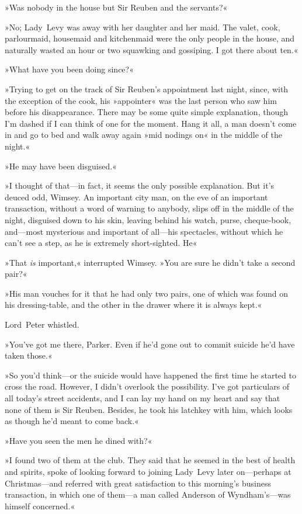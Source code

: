 »Was nobody in the house but Sir Reuben and the servants?«

»No; Lady~Levy was away with her daughter and her maid. The valet, cook, parlourmaid, housemaid and kitchenmaid were the only people in the house, and naturally wasted an hour or two squawking and gossiping. I got there about ten.«

»What have you been doing since?«

»Trying to get on the track of Sir Reuben's appointment last night, since, with the exception of the cook, his »appointer« was the last person who saw him before his disappearance. There may be some quite simple explanation, though I'm dashed if I can think of one for the moment. Hang it all, a man doesn't come in and go to bed and walk away again »mid nodings on« in the middle of the night.«

»He may have been disguised.«

»I thought of that—in fact, it seems the only possible explanation. But it's deuced odd, Wimsey. An important city man, on the eve of an important transaction, without a word of warning to anybody, slips off in the middle of the night, disguised down to his skin, leaving behind his watch, purse, cheque-book, and—most mysterious and important of all—his spectacles, without which he can't see a step, as he is extremely short-sighted. He\longdash«

»That \textit{is} important,« interrupted Wimsey. »You are sure he didn't take a second pair?«

»His man vouches for it that he had only two pairs, one of which was found on his dressing-table, and the other in the drawer where it is always kept.«

Lord~Peter whistled.

»You've got me there, Parker. Even if he'd gone out to commit suicide he'd have taken those.«

»So you'd think—or the suicide would have happened the first time he started to cross the road. However, I didn't overlook the possibility. I've got particulars of all today's street accidents, and I can lay my hand on my heart and say that none of them is Sir Reuben. Besides, he took his latchkey with him, which looks as though he'd meant to come back.«

»Have you seen the men he dined with?«

»I found two of them at the club. They said that he seemed in the best of health and spirits, spoke of looking forward to joining Lady~Levy later on—perhaps at Christmas—and referred with great satisfaction to this morning's business transaction, in which one of them—a man called Anderson of Wyndham's—was himself concerned.«

